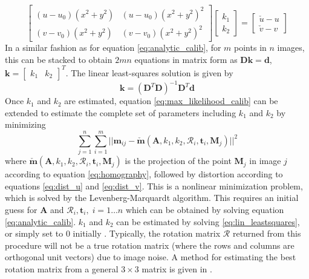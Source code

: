 \begin{equation}
    \begin{bmatrix}(u-u_0)(x^2+y^2) & (u-u_0)(x^2+y^2)^2\\ (v-v_0)(x^2+y^2) & (v-v_0)(x^2+y^2)^2\end{bmatrix}\begin{bmatrix}k_1\\k_2\end{bmatrix}=\begin{bmatrix}\check{u}-u\\\check{v}-v\end{bmatrix}
\end{equation}
In a similar fashion as for equation \ref{eq:analytic_calib}, for $m$ points in $n$ images, this can be stacked to obtain $2mn$ equations in matrix form as $\mathbf{Dk}=\mathbf{d}$, $\mathbf{k}=\begin{bmatrix}k_1 & k_2\end{bmatrix}^T$. The linear least-squares solution is given by
\begin{equation}
    \label{eq:lin_leastsquares}
    \mathbf{k}=(\mathbf{D}^T\mathbf{D})^{-1}\mathbf{D}^T\mathbf{d}
\end{equation}
Once $k_1$ and $k_2$ are estimated, equation \ref{eq:max_likelihood_calib} can be extended to estimate the complete set of parameters including $k_1$ and $k_2$ by minimizing
\begin{equation}
\label{eq:max_likelihood_distorted}
    \sum_{j=1}^{n}\sum_{i=1}^{m}||\mathbf{m}_{ij}-\mathbf{\check{m}}(\mathbf{A},k_1,k_2,\mathcal{R}_i,\mathbf{t}_i,\mathbf{M}_j)||^2
\end{equation}
where $\mathbf{\check{m}}(\mathbf{A},k_1,k_2,\mathcal{R}_i,\mathbf{t}_i,\mathbf{M}_j)$ is the projection of the point $\mathbf{M}_j$ in image $j$ according to equation \ref{eq:homography}, followed by distortion according to equations \ref{eq:dist_u} and \ref{eq:dist_v}. This is a nonlinear minimization problem, which is solved by the Levenberg-Marquardt algorithm. This requires an initial guess for $\mathbf{A}$ and $\mathcal{R}_i,\mathbf{t}_i,\; i=1\dots n$ which can be obtained by solving equation \ref{eq:analytic_calib}. $k_1$ and $k_2$ can be estimated by solving \ref{eq:lin_leastsquares}, or simply set to 0 initially \cite{zhangTech}. Typically, the rotation matrix $\mathcal{R}$ returned from this procedure will not be a true rotation matrix (where the rows and columns are orthogonal unit vectors) due to image noise. A method for estimating the best rotation matrix from a general $3\times3$ matrix is given in \cite{zhangTech}.
